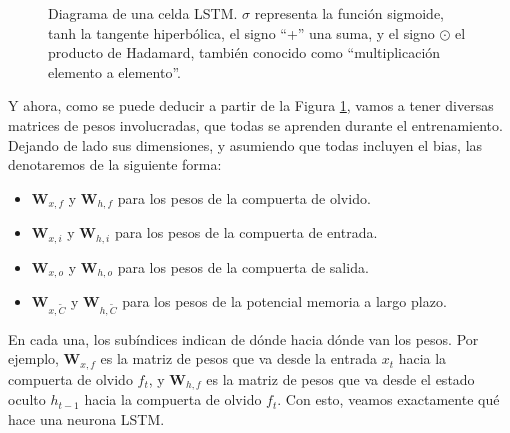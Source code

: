 \documentclass[../../main.tex]{subfiles}
\begin{document}
\begin{figure}
    \caption{Diagrama de una celda LSTM. \(\sigma\) representa la función sigmoide, tanh
    la tangente hiperbólica, el signo ``+'' una suma, y el signo \(\odot\) el producto de
    Hadamard, también conocido como ``multiplicación elemento a elemento''.}
    \label{fig:lstm-cell}
\end{figure}

Y ahora, como se puede deducir a partir de la Figura \ref{fig:lstm-cell}, vamos a tener
diversas matrices de pesos involucradas, que todas se aprenden durante el entrenamiento.
Dejando de lado sus dimensiones, y asumiendo que todas incluyen el bias, las denotaremos
de la siguiente forma:
\begin{itemize}
    \item \(\bm{W}_{x,f}\) y \(\bm{W}_{h,f}\) para los pesos de la compuerta de olvido.
    \item \(\bm{W}_{x,i}\) y \(\bm{W}_{h,i}\) para los pesos de la compuerta de entrada.
    \item \(\bm{W}_{x,o}\) y \(\bm{W}_{h,o}\) para los pesos de la compuerta de salida.
    \item \(\bm{W}_{x, \tilde{C}}\) y \(\bm{W}_{h, \tilde{C}}\) para los pesos de la potencial
    memoria a largo plazo.
\end{itemize}
En cada una, los subíndices indican de dónde hacia dónde van los pesos. Por ejemplo,
\(\bm{W}_{x,f}\) es la matriz de pesos que va desde la entrada \(x_t\) hacia la compuerta
de olvido \(f_t\), y \(\bm{W}_{h,f}\) es la matriz de pesos que va desde el estado oculto
\(h_{t-1}\) hacia la compuerta de olvido \(f_t\). Con esto, veamos exactamente qué
hace una neurona LSTM.
\end{document}
